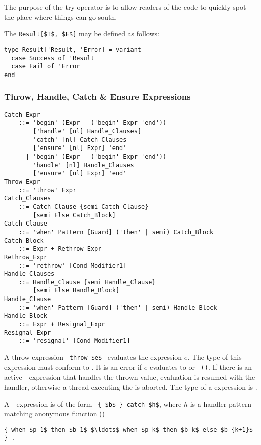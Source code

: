 The purpose of the try operator is to allow readers of the code to quickly spot the place where things can go south.

The \lstinline!Result[$T$, $E$]! may be defined as follows:
\begin{lstlisting}
type Result['Result, 'Error] = variant
  case Success of 'Result
  case Fail of 'Error
end
\end{lstlisting}





\subsubsection{Throw, Handle, Catch \& Ensure Expressions}
\label{sec:throw-catch-expressions}

\grammar\begin{lstlisting}
Catch_Expr
    ::= 'begin' (Expr - ('begin' Expr 'end'))
        ['handle' [nl] Handle_Clauses]
        'catch' [nl] Catch_Clauses
        ['ensure' [nl] Expr] 'end'
      | 'begin' (Expr - ('begin' Expr 'end')) 
        'handle' [nl] Handle_Clauses
        ['ensure' [nl] Expr] 'end'
Throw_Expr
    ::= 'throw' Expr
Catch_Clauses 
    ::= Catch_Clause {semi Catch_Clause}
        [semi Else Catch_Block]
Catch_Clause 
    ::= 'when' Pattern [Guard] ('then' | semi) Catch_Block
Catch_Block 
    ::= Expr + Rethrow_Expr
Rethrow_Expr
    ::= 'rethrow' [Cond_Modifier1]
Handle_Clauses 
    ::= Handle_Clause {semi Handle_Clause}
        [semi Else Handle_Block]
Handle_Clause 
    ::= 'when' Pattern [Guard] ('then' | semi) Handle_Block
Handle_Block
    ::= Expr + Resignal_Expr
Resignal_Expr 
    ::= 'resignal' [Cond_Modifier1]
\end{lstlisting}

A throw expression ~\lstinline!throw $e$!~ evaluates the expression $e$. The type of this expression must conform to . It is an error if $e$ evaluates to  or ~\lstinline!()!. If there is an active - expression that handles the thrown value, evaluation is resumed with the handler, otherwise a thread executing the  is aborted. The type of a  expression is . 

A - expression is of the form ~\lstinline!{ $b$ } catch $h$!, where $h$ is a handler pattern matching anonymous function ()
\begin{lstlisting}
{ when $p_1$ then $b_1$ $\ldots$ when $p_k$ then $b_k$ else $b_{k+1}$ } .
\end{lstlisting}

